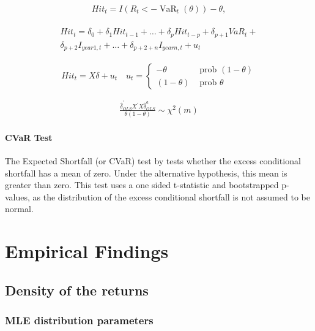 \documentclass[a4paper, twoside]{templates/ociamthesis}
\begin{document}
\begin{align}
Hit_{t}=I\left(R_{t}<-\operatorname{VaR}_{t}(\theta)\right)-\theta,
\label{eq:dq1}
\end{align}

\begin{align}
\begin{array}{c}
Hit_{t}=\delta_{0}+\delta_{1} H i t_{t-1}+\ldots+\delta_{p} Hit_{t-p}+\delta_{p+1} VaR_{t}+ \\
\delta_{p+2} I_{year1, t}+\ldots+\delta_{p+2+n} I_{year n, t}+u_{t} \end{array}
\label{eq:dq2}
\end{align}

\[Hit_{t}=X \delta+u_{t} \quad u_{t}=\left\{\begin{array}{ll}
-\theta & \text { prob }(1-\theta) \\
(1-\theta) & \text { prob } \theta
\end{array}\right.\]

\begin{align}
\frac{\hat{\delta}_{O L S}^{\prime} X^{\prime} X \hat{\delta}_{O L S}^{a}}{\theta(1-\theta)} \sim \chi^{2}(m)
\label{eq:dq3}
\end{align}

\hypertarget{cvar-test}{%
\subsubsection{CVaR Test}\label{cvar-test}}

The Expected Shortfall (or CVaR) test by \textcite{mcneil2000} tests whether the excess conditional shortfall has a mean of zero. Under the alternative hypothesis, this mean is greater than zero. This test uses a one sided t-statistic and bootstrapped p-values, as the distribution of the excess conditional shortfall is not assumed to be normal.

\hypertarget{analysis}{%
\chapter{Empirical Findings}\label{analysis}}

\minitoc 

\hypertarget{density-of-the-returns}{%
\section{Density of the returns}\label{density-of-the-returns}}

\hypertarget{mle-distribution-parameters}{%
\subsection{MLE distribution parameters}\label{mle-distribution-parameters}}
\end{document}

